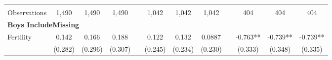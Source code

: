 \begin{landscape}
\begin{table}[htpb!]
\begin{center}
\begin{tabular}{lcccp{2mm}cccp{2mm}ccc}
\begin{footnotesize}\end{footnotesize}&\begin{footnotesize}\end{footnotesize}&\begin{footnotesize}\end{footnotesize}&\begin{footnotesize}\end{footnotesize}&\begin{footnotesize}\end{footnotesize}&\begin{footnotesize}\end{footnotesize}&\begin{footnotesize}\end{footnotesize}&\begin{footnotesize}\end{footnotesize}&\begin{footnotesize}\end{footnotesize}&\begin{footnotesize}\end{footnotesize}&\begin{footnotesize}\end{footnotesize}&\begin{footnotesize}\end{footnotesize}\\Observations&1,490&1,490&1,490&&1,042&1,042&1,042&&404&404&404\\
\multicolumn{12}{l}{\textbf{Boys IncludeMissing}}\\ 
Fertility&0.142&0.166&0.188&&0.122&0.132&0.0887&&-0.763**&-0.739**&-0.739**\\
&(0.282)&(0.296)&(0.307)&&(0.245)&(0.234)&(0.230)&&(0.333)&(0.348)&(0.335)\\

\end{tabular}
\end{center}
\end{table}
\end{landscape}
